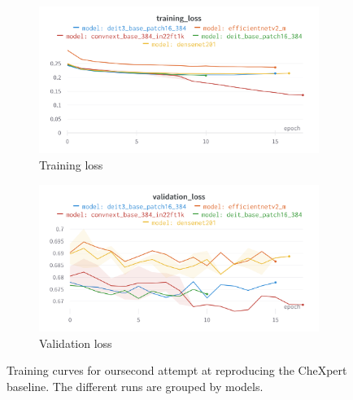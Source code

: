 \documentclass[11pt]{article}
\begin{document}
                \begin{figure}[H]
                     \centering
                     \begin{subfigure}[b]{0.45\textwidth}
                         \centering
                         \includegraphics[width=\textwidth]{plots/chexpert_training_loss2}
                         \caption{Training loss}
                         \vspace{4ex}
                         \label{fig:chexpert_training_loss2}
                     \end{subfigure}
                     \hfill
                     \begin{subfigure}[b]{0.45\textwidth}
                         \centering
                         \includegraphics[width=\textwidth]{plots/chexpert_validation_loss2}
                         \caption{Validation loss}
                         \vspace{4ex}
                         \label{fig:chexpert_validation_loss2}
                     \end{subfigure}

                     \caption{Training curves for oursecond attempt at reproducing the CheXpert baseline. The different runs are grouped by models.}
                \end{figure}
\end{document}

